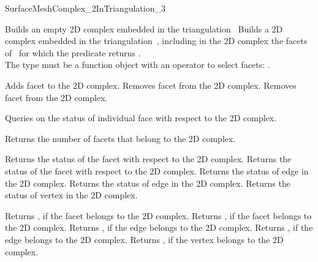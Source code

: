 \begin{ccRefConcept}{SurfaceMeshComplex_2InTriangulation_3}
\ccCreation
{}  %

{}
 {Builds an empty 2D complex embedded in the triangulation~}
\ccGlue
{}
{Builds a 2D complex embedded in the triangulation~,
including in the 2D complex the facets of~ for 
 which the predicate  returns .\\
The type  must be
a function object with an operator to select facets:
.}


\ccGlue
{}
{Adds facet  to the 2D complex.}
\ccGlue
{}
{Removes facet  from  the 2D complex.}
\ccGlue
{}
{Removes facet  from the 2D complex.}

Queries on the status  of individual face with respect to the 2D complex.

{Returns the number of facets that belong to the 2D complex.}

{Returns the status of the facet   with respect to  the 2D complex.}
\ccGlue
{}
{Returns the status of the facet  with respect to  the 2D complex.}
\ccGlue
{}
{Returns the status of edge  in the 2D complex.}
\ccGlue
{}
{Returns the status of edge   in the 2D complex.}
\ccGlue
{}
{Returns the status of vertex  in the 2D complex.}


{Returns , if the facet  belongs to the 2D complex.}
\ccGlue
{}
{Returns , if the facet  belongs to the 2D complex.}
\ccGlue
{}
{Returns , if the edge   belongs to the 2D complex.}
\ccGlue
{}
{Returns , if the edge  belongs to the 2D complex.}
\ccGlue
{}
{Returns , if the vertex  belongs to the 2D complex.}



\end{ccRefConcept}
